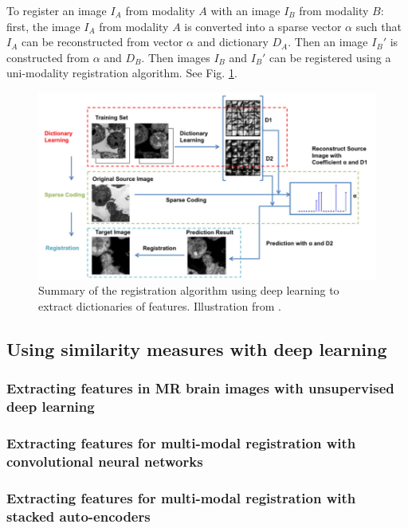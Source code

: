 \documentclass[11pt]{article} %
\begin{document}
To register an image $I_A$ from modality $A$ with an image $I_B$ from modality $B$: first, the image $I_A$ from modality $A$ is converted into a sparse vector $\alpha$ such that $I_A$ can be reconstructed from vector $\alpha$ and dictionary $D_A$. Then an image $I_B'$ is constructed from $\alpha$ and $D_B$. Then images $I_B$ and $I_B'$ can be registered using a uni-modality registration algorithm. See Fig. \ref{fig:dico}.
\begin{figure}[h!]
  \centering
  \includegraphics[width=\linewidth]{dico.png}
  \caption{Summary of the registration algorithm using deep learning to extract dictionaries of features. Illustration from \cite{cao:analogies}.}
  \label{fig:dico}
\end{figure}


  \subsection{Using similarity measures with deep learning \cite{litjens:deeplearning}}
    \subsubsection{Extracting features in MR brain images with unsupervised deep learning \linebreak[4] \cite{wu:features} }
    \subsubsection{Extracting features for multi-modal registration with convolutional neural \linebreak[4] networks \cite{simonovsky:crossmodalfeatures}}
    \subsubsection{Extracting features for multi-modal registration with stacked auto-encoders \linebreak[4] \cite{cheng:deepsimilarity}}
\end{document}
